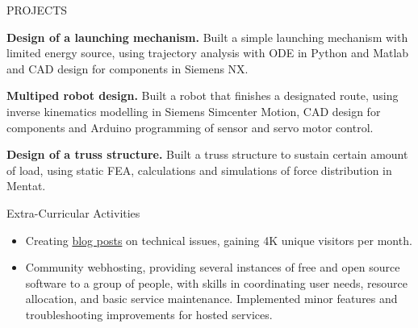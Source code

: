 \documentclass{resume} %
\begin{document}

 




\begin{rSection}{PROJECTS}
\vspace{-1.25em}
\item \textbf{Design of a launching mechanism.} {Built a simple launching mechanism with limited energy source, using trajectory analysis with ODE in Python and Matlab and CAD design for components in Siemens NX.}
\item \textbf{Multiped robot design.} {Built a robot that finishes a designated route, using inverse kinematics modelling in Siemens Simcenter Motion, CAD design for components and Arduino programming of sensor and servo motor control.}
\item \textbf{Design of a truss structure.} {Built a truss structure to sustain certain amount of load, using static FEA, calculations and simulations of force distribution in Mentat.}
\end{rSection} 

\begin{rSection}{Extra-Curricular Activities} 
\begin{itemize}
    \item 	Creating \href{https://obsp.de/}{blog posts} on technical issues, gaining 4K unique visitors per month.
    \item	Community webhosting, providing several instances of free and open source software to a group of people, with skills in coordinating user needs, resource allocation, and basic service maintenance. Implemented minor features and troubleshooting improvements for hosted services.
\end{itemize}


\end{rSection}
\end{document}
